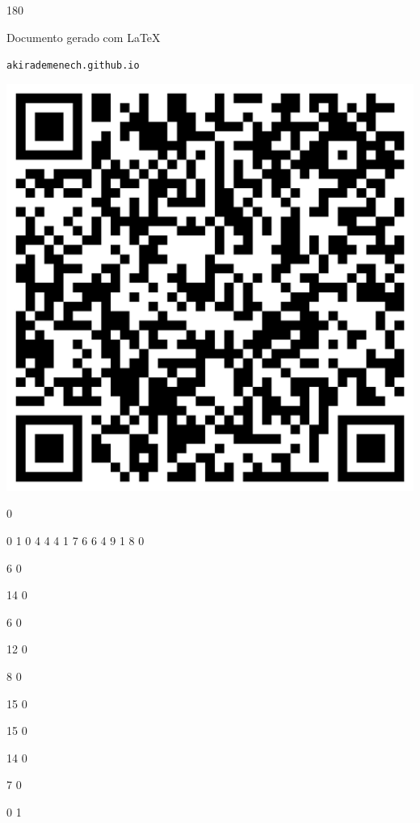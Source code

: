 \documentclass[12pt]{article}
\begin{document}
	\begin{turn}{180}	
		\begin{minipage}{\textwidth}		  
		  Documento gerado com \LaTeX			
		  
		  \texttt{akirademenech.github.io}

		  \includegraphics[height=0.3\textheight]{2e-2.pdf}

		\end{minipage}	
	\end{turn}  
		  
		\vfill  
		  
{
	0	%

	0	%
	1	%
	0	%
	4	%
	4	%
	4	%
	1	%
	7	%
	6	%
	6	%
	4	%
	9	%
	1	%
	8	%
	0	%

	6	%
	0	%

	14	%
	0	%

	6	%
	0	%

	12	%
	0	%

	8	%
	0	%

	15	%
	0	%

	15	%
	0	%

	14	%
	0	%

	7	%
	0	%

	0	%
	1	%
}	  
		    	
\end{document}
